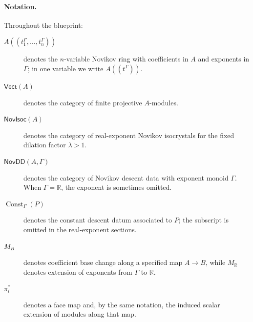 \paragraph{Notation.}
Throughout the blueprint:
\begin{description}
  \item[$A((t_1^\Gamma,\dotsc,t_n^\Gamma))$] denotes the $n$-variable Novikov
    ring with coefficients in $A$ and exponents in $\Gamma$; in one variable
    we write $A((t^\Gamma))$.
  \item[$\mathsf{Vect}(A)$] denotes the category of finite projective
    $A$-modules.
  \item[$\mathsf{NovIsoc}(A)$] denotes the category of real-exponent Novikov
    isocrystals for the fixed dilation factor $\lambda>1$.
  \item[$\mathsf{NovDD}(A,\Gamma)$] denotes the category of Novikov descent
    data with exponent monoid $\Gamma$.  When $\Gamma=\mathbb{R}$, the exponent
    is sometimes omitted.
  \item[$\operatorname{Const}_\Gamma(P)$] denotes the constant descent datum
    associated to $P$; the subscript is omitted in the real-exponent sections.
  \item[$M_B$] denotes coefficient base change along a specified map
    $A\to B$, while $M_{\mathbb{R}}$ denotes extension of exponents from
    $\Gamma$ to $\mathbb{R}$.
  \item[$\pi_i^\ast$] denotes a face map and, by the same notation, the induced
    scalar extension of modules along that map.
\end{description}
